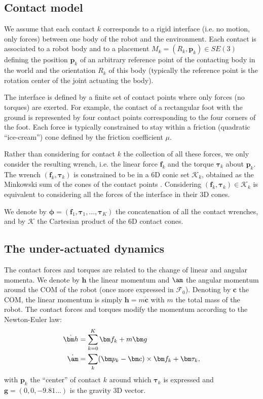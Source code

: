 \subsection{Contact model}
We assume that each contact $k$ corresponds to a rigid interface (i.e. no motion, only forces) between one body of the robot and the environment. Each contact is associated to a robot body and to a placement $M_k = (R_k,\bm p_k) \in SE(3)$ defining the position $\bm p_k$ of an arbitrary reference point of the contacting body in the world and the orientation $R_k$ of this body (typically the reference point is the rotation center of the joint actuating the body).

The interface is defined by a finite set of contact points where only forces (no torques) are exerted. For example, the contact of a rectangular foot with the ground is represented by four contact points corresponding to the four corners of the foot. 
Each force is typically constrained to stay within a friction (quadratic ``ice-cream'') cone defined by the friction coefficient $\mu$. 

Rather than considering for contact $k$ the collection of all these forces, we only consider the resulting wrench, i.e. the linear force $\bm f_k$ and the torque $\bm \tau_k$ about $\bm p_k$. The wrench $(\bm f_k, \bm \tau_k)$ is constrained to be in a 6D conic set $\mathcal{K}_k$, obtained as the Minkowski sum of the cones of the contact points \cite{caron_icra15}. Considering $(\bm f_k, \bm \tau_k) \in \mathcal{K}_{k}$ is equivalent to considering all the forces of the interface in their 3D cones.

We denote by $\bm \phi = (\bm f_1, \bm \tau_1, ..., \bm \tau_K)$ the concatenation of all the contact wrenches, and by $\mathcal{K}$ the Cartesian product of the 6D contact cones.

\subsection{The under-actuated dynamics}
The contact forces and torques are related to the change of linear and angular momenta. We denote by $\bm h$ the linear momentum and $\am$ the angular momentum around the COM of the robot (once more expressed in $\mathcal{F}_0$). Denoting by $\bm c$ the COM, the linear momentum is simply $\bm h = m \dot{\bm c}$ with $m$ the total mass of the robot.
The contact forces and torques modify the momentum according to the Newton-Euler law:
\begin{subequations}\label{eq:momentum}
\begin{align}
  \dot{\bm h}&= \sum_{k=0}^K \bm f_{k} + m \bm g \label{eq:linear_momentum}\\
  \dot {\am} &= \sum_{k} (\bm p_{k} - \bm c) \times \bm f_{k} + \bm \tau_{k} \label{eq:angular_momentum},
\end{align}
\end{subequations}
with $\bm p_k$ the ``center'' of contact $k$ around which $\bm \tau_k$ is expressed and $\bm g = (0,0,-9.81...)$ is the gravity 3D vector.

